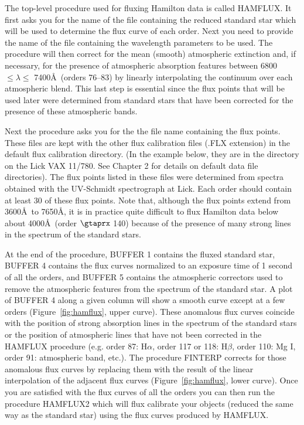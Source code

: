 The top-level procedure used for fluxing Hamilton data is called {\tenit
HAMFLUX}. It first asks you for the name of the file containing the reduced
standard star which will be used to determine the flux curve of each order.
Next you need to provide the name of the file containing the wavelength
parameters to be used. The procedure will then correct for the mean (smooth)
atmospheric extinction and, if necessary, for the presence of atmospheric
absorption features between 6800 $\leq \lambda \leq $ 7400\AA\ (orders 76--83)
by linearly interpolating the continuum over each atmospheric blend. This last
step is essential since the flux points that will be used later were
determined from standard stars that have been corrected for the presence of
these atmospheric bands.

Next the procedure asks you for the the file name containing the flux points.
These files are kept with the other flux calibration files (.FLX extension) in
the default flux calibration directory. (In the example below, they are in the
directory  on the Lick VAX 11/780.  See Chapter 2 for
details on default data file directories). The flux points listed in these
files were determined from spectra obtained with the UV-Schmidt spectrograph
at Lick. Each order should contain at least 30 of these flux points. Note
that, although the flux points extend from 3600\AA\ to 7650\AA, it is in
practice quite difficult to flux Hamilton data below about 4000\AA\ (order
$\gtaprx$ 140) because of the presence of many strong lines in the spectrum of
the standard stars.

At the end of the procedure, BUFFER 1 contains the fluxed standard star,
BUFFER 4 contains the flux curves normalized to an exposure time of 1 second
of all the orders, and BUFFER 5 contains the atmospheric correctors used to
remove the atmospheric features from the spectrum of the standard star. A plot
of BUFFER 4 along a given column will show a smooth curve except at a few
orders (Figure~\ref{fig:hamflux}, upper curve).  These anomalous flux curves
coincide with the position of strong absorption lines in the spectrum of the
standard stars or the position of atmospheric lines that have not been
corrected in the {\tenit HAMFLUX} procedure (e.g. order 87: H$\alpha$,
order 117 or
118: H$\beta$, order 110: Mg I, order 91: atmospheric band, etc.). The
procedure {\tenit FINTERP} corrects for those anomalous flux curves by
replacing them with the result of the linear interpolation of the adjacent
flux curves (Figure~\ref{fig:hamflux}, lower curve). Once you are satisfied
with the flux curves of all the orders you can then run the procedure {\tenit
HAMFLUX2} which will flux calibrate your objects (reduced the same way as the
standard star) using the flux curves produced by {\tenit HAMFLUX}.

